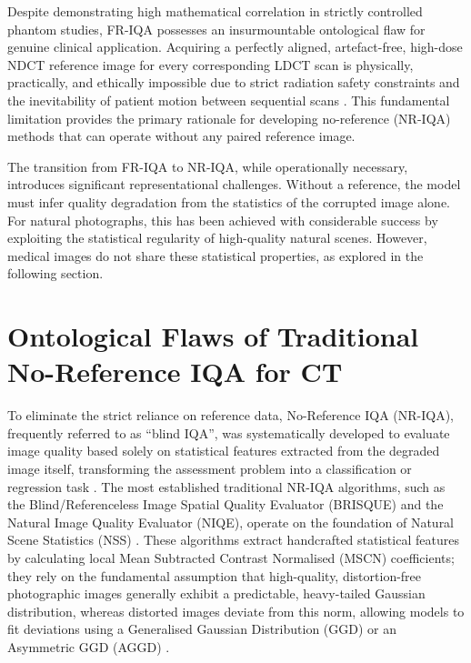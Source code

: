 Despite demonstrating high mathematical correlation in strictly controlled phantom studies,
FR-IQA possesses an insurmountable ontological flaw for genuine clinical application.
Acquiring a perfectly aligned, artefact-free, high-dose NDCT reference image for every
corresponding LDCT scan is physically, practically, and ethically impossible due to strict
radiation safety constraints and the inevitability of patient motion between sequential
scans \cite{athar2019comprehensive}. This fundamental limitation provides the primary
rationale for developing no-reference (NR-IQA) methods that can operate without any
paired reference image.

The transition from FR-IQA to NR-IQA, while operationally necessary, introduces
significant representational challenges. Without a reference, the model must infer quality
degradation from the statistics of the corrupted image alone. For natural photographs,
this has been achieved with considerable success by exploiting the statistical regularity
of high-quality natural scenes. However, medical images do not share these statistical
properties, as explored in the following section.


\section{Ontological Flaws of Traditional No-Reference IQA for CT}
\label{sec:lit_nr_iqa_failures}

To eliminate the strict reliance on reference data, No-Reference IQA (NR-IQA), frequently
referred to as ``blind IQA'', was systematically developed to evaluate image quality based
solely on statistical features extracted from the degraded image itself, transforming the
assessment problem into a classification or regression task \cite{wang2006modern}. The
most established traditional NR-IQA algorithms, such as the Blind/Referenceless Image
Spatial Quality Evaluator (BRISQUE) and the Natural Image Quality Evaluator (NIQE),
operate on the foundation of Natural Scene Statistics (NSS) \cite{hu2024niqe}. These
algorithms extract handcrafted statistical features by calculating local Mean Subtracted
Contrast Normalised (MSCN) coefficients; they rely on the fundamental assumption that
high-quality, distortion-free photographic images generally exhibit a predictable,
heavy-tailed Gaussian distribution, whereas distorted images deviate from this norm,
allowing models to fit deviations using a Generalised Gaussian Distribution (GGD) or an
Asymmetric GGD (AGGD) \cite{sheikh2005nss}.

